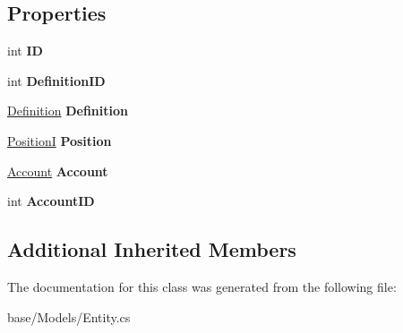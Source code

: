 \subsection*{Properties}
\begin{DoxyCompactItemize}
\item 
\hypertarget{classCore_1_1Models_1_1Entity_aa7b2cae79fc1801861c7cd20e273e3fd}{int {\bfseries I\-D}}\label{classCore_1_1Models_1_1Entity_aa7b2cae79fc1801861c7cd20e273e3fd}

\item 
\hypertarget{classCore_1_1Models_1_1Entity_a451f76265fc15cbcdfc1ac5233bf79e9}{int {\bfseries Definition\-I\-D}}\label{classCore_1_1Models_1_1Entity_a451f76265fc15cbcdfc1ac5233bf79e9}

\item 
\hypertarget{classCore_1_1Models_1_1Entity_a9d7325d3a3958dc2acfe798a2fb5a98c}{\hyperlink{classCore_1_1Models_1_1Definitions_1_1Definition}{Definition} {\bfseries Definition}}\label{classCore_1_1Models_1_1Entity_a9d7325d3a3958dc2acfe798a2fb5a98c}

\item 
\hypertarget{classCore_1_1Models_1_1Entity_a0c56e42b49dbe385d0e201a42ab1feea}{\hyperlink{classCore_1_1Models_1_1PositionI}{Position\-I} {\bfseries Position}}\label{classCore_1_1Models_1_1Entity_a0c56e42b49dbe385d0e201a42ab1feea}

\item 
\hypertarget{classCore_1_1Models_1_1Entity_a251c782d21abe40fea048ed9fc092016}{\hyperlink{classCore_1_1Models_1_1Account}{Account} {\bfseries Account}}\label{classCore_1_1Models_1_1Entity_a251c782d21abe40fea048ed9fc092016}

\item 
\hypertarget{classCore_1_1Models_1_1Entity_ae76291dccb6d9e8c2ecfb5e586ce251b}{int {\bfseries Account\-I\-D}}\label{classCore_1_1Models_1_1Entity_ae76291dccb6d9e8c2ecfb5e586ce251b}

\end{DoxyCompactItemize}
\subsection*{Additional Inherited Members}


The documentation for this class was generated from the following file\-:\begin{DoxyCompactItemize}
\item 
base/\-Models/Entity.\-cs\end{DoxyCompactItemize}
